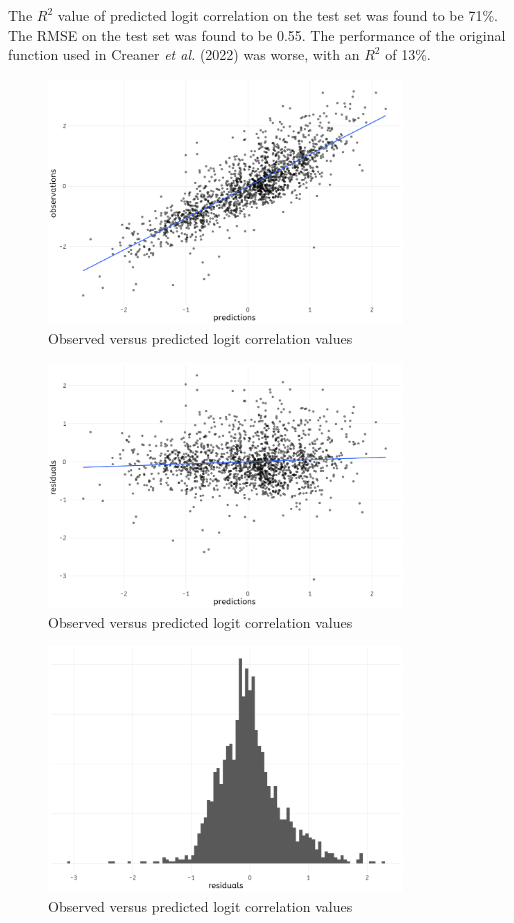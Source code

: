 \documentclass[a4paper,fleqn,usenatbib]{mnras}
\begin{document}
The \(R^2\) value of predicted logit correlation on the test set was
found to be 71\%. The RMSE on the test set was found to be 0.55. The
performance of the original function used in Creaner \emph{et al.}
(2022) was worse, with an \(R^2\) of 13\%.

\begin{figure}
  \includegraphics[width=\columnwidth, height = 6.5cm]{figures/observed-predicted}
    \caption{Observed versus predicted logit correlation values}
    \label{fig:obs-pred}
\end{figure}

\begin{figure}
  \includegraphics[width=\columnwidth, height = 6.5cm]{figures/residuals-predicted}
    \caption{Observed versus predicted logit correlation values}
    \label{fig:residuals-pred}
\end{figure}

\begin{figure}
  \includegraphics[width=\columnwidth, height = 6.5cm]{figures/residuals-hist}
    \caption{Observed versus predicted logit correlation values}
    \label{fig:residuals-hist}
\end{figure}
\end{document}
